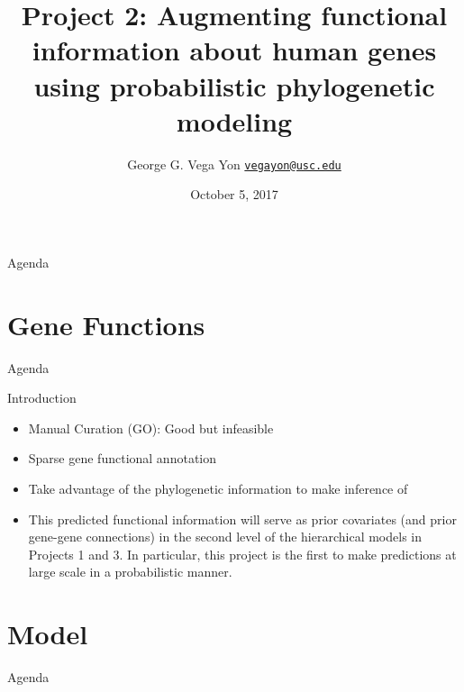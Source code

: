 \documentclass[9pt,handout,ignorenonframetext,]{beamer}
\title{Project 2: Augmenting functional information about human genes using
probabilistic phylogenetic modeling}
\author[
Vega Yon
]{George G. Vega Yon
\linebreak[4] \href{mailto:vegayon@usc.edu}{\nolinkurl{vegayon@usc.edu}}}
\institute[USC]{Department of Preventive Medicine \and University of Southern California}
\date{October 5, 2017}
\providecommand{\tightlist}{%
  \setlength{\itemsep}{0pt}\setlength{\parskip}{0pt}}
\begin{document}

\begin{frame}{Agenda}

\tableofcontents{}

\end{frame}

\section{Gene Functions}\label{gene-functions}

\begin{frame}{Agenda}

\tableofcontents[currentsection]

\end{frame}

\begin{frame}{Introduction}

\begin{itemize}
\tightlist
\item
  Manual Curation (GO): Good but infeasible \pause
\item
  Sparse gene functional annotation \pause
\item
  Take advantage of the phylogenetic information to make inference of
  \pause
\item
  This predicted functional information will serve as prior covariates
  (and prior gene-gene connections) in the second level of the
  hierarchical models in Projects 1 and 3. In particular, this project
  is the first to make predictions at large scale in a probabilistic
  manner.
\end{itemize}

\end{frame}

\section{Model}\label{model}

\begin{frame}[t]{Agenda}

\tableofcontents[currentsection]

\end{frame}
\end{document}
